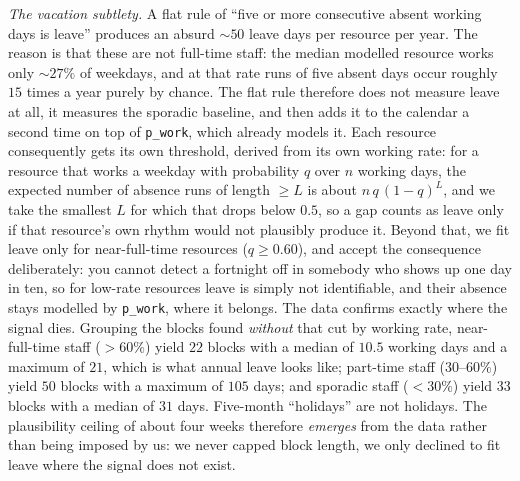 \emph{The vacation subtlety.} A flat rule of ``five or more consecutive absent
working days is leave'' produces an absurd $\sim\!50$ leave days per resource
per year. The reason is that these are not full-time staff: the median modelled
resource works only $\sim\!27\%$ of weekdays, and at that rate runs of five
absent days occur roughly $15$ times a year purely by chance. The flat rule
therefore does not measure leave at all, it measures the sporadic baseline, and
then adds it to the calendar a second time on top of \texttt{p\_work}, which
already models it. Each resource consequently gets its own threshold, derived
from its own working rate: for a resource that works a weekday with probability
$q$ over $n$ working days, the expected number of absence runs of length
$\geq L$ is about $n\,q\,(1-q)^L$, and we take the smallest $L$ for which that
drops below $0.5$, so a gap counts as leave only if that resource's own rhythm
would not plausibly produce it. Beyond that, we fit leave only for
near-full-time resources ($q \geq 0.60$), and accept the consequence
deliberately: you cannot detect a fortnight off in somebody who shows up one
day in ten, so for low-rate resources leave is simply not identifiable, and
their absence stays modelled by \texttt{p\_work}, where it belongs. The data
confirms exactly where the signal dies. Grouping the blocks found \emph{without}
that cut by working rate, near-full-time staff ($>60\%$) yield $22$ blocks with
a median of $10.5$ working days and a maximum of $21$, which is what annual
leave looks like; part-time staff ($30$--$60\%$) yield $50$ blocks with a
maximum of $105$ days; and sporadic staff ($<30\%$) yield $33$ blocks with a
median of $31$ days. Five-month ``holidays'' are not holidays. The plausibility
ceiling of about four weeks therefore \emph{emerges} from the data rather than
being imposed by us: we never capped block length, we only declined to fit
leave where the signal does not exist.

